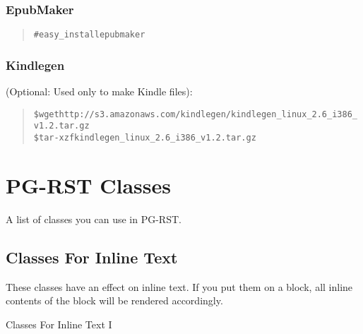 \documentclass[a5paper]{book}
\begin{document}
\begin{german}
%
\label{id5}%
\hypertarget{id5}{}%
%
\subsection*{EpubMaker}


\begin{quote}
\begin{alltt}
\# easy\_install epubmaker
\end{alltt}
\end{quote}

%
\label{kindlegen}%
\hypertarget{kindlegen}{}%
%
\subsection*{Kindlegen}


(Optional: Used only to make Kindle files):\par

\begin{quote}
\begin{alltt}
\$ wget http://s3.amazonaws.com/kindlegen/kindlegen\_linux\_2.6\_i386\_v1.2.tar.gz
\$ tar -xzf kindlegen\_linux\_2.6\_i386\_v1.2.tar.gz
\end{alltt}
\end{quote}

\cleardoublepage
\label{pg-rst-classes}%
\hypertarget{pg-rst-classes}{}%
%
\chapter*{PG-RST Classes}


A list of classes you can use in PG-RST.\par

%
\label{classes-for-inline-text}%
\hypertarget{classes-for-inline-text}{}%
%
\section*{Classes For Inline Text}


These classes have an effect on inline text. If you put them on a block, all
inline contents of the block will be rendered accordingly.\par

\begin{table}[htbp]
\label{table-46}%
\hypertarget{table-46}{}%
\footnotesize
\begin{center}
\caption{Classes For Inline Text I}




\end{center}
\end{table}
\end{german}
\end{document}
